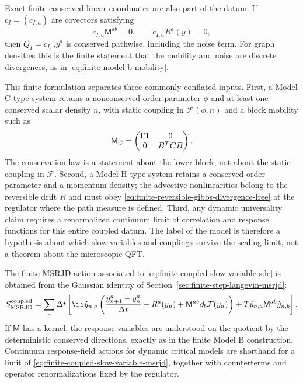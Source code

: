Exact finite conserved linear coordinates are also part of the datum.  If
\(c_I=(c_{I,a})\) are covectors satisfying
\begin{equation}
  c_{I,a}\mathsf M^{ab}=0,
  \qquad
  c_{I,a}R^a(y)=0 ,
  \label{eq:finite-coupled-conserved-covectors}
\end{equation}
then \(Q_I=c_{I,a}y^a\) is conserved pathwise, including the noise term.  For
graph densities this is the finite statement that the mobility and noise are
discrete divergences, as in \eqref{eq:finite-model-b-mobility}.

This finite formulation separates three commonly conflated inputs.  First, a
Model C type system retains a nonconserved order parameter \(\phi\) and at
least one conserved scalar density \(n\), with static coupling in
\(\mathcal F(\phi,n)\) and a block mobility such as
\[
  \mathsf M_{\rm C}
  =
  \begin{pmatrix}
    \Gamma \mathbf1 & 0\\
    0 & B^TCB
  \end{pmatrix}.
\]
The conservation law is a statement about the lower block, not about the
static coupling in \(\mathcal F\).  Second, a Model H type system retains a
conserved order parameter and a momentum density; the advective nonlinearities
belong to the reversible drift \(R\) and must obey
\eqref{eq:finite-reversible-gibbs-divergence-free} at the regulator where the
path measure is defined.  Third, any dynamic universality claim requires a
renormalized continuum limit of correlation and response functions for this
entire coupled datum.  The label of the model is therefore a hypothesis about
which slow variables and couplings survive the scaling limit, not a theorem
about the microscopic QFT.

The finite MSRJD action associated to
\eqref{eq:finite-coupled-slow-variable-sde} is obtained from the Gaussian
identity of Section~\ref{sec:finite-step-langevin-msrjd}:
\begin{equation}
  S_{\rm MSRJD}^{\rm coupled}
  =
  \sum_n\Delta t
  \left[
    \ii\hat y_{n,a}
    \left(
      \frac{y_{n+1}^a-y_n^a}{\Delta t}
      -R^a(y_n)
      +\mathsf M^{ab}\partial_b\mathcal F(y_n)
    \right)
    +
    T\hat y_{n,a}\mathsf M^{ab}\hat y_{n,b}
  \right].
  \label{eq:finite-coupled-slow-variable-msrjd}
\end{equation}
If \(\mathsf M\) has a kernel, the response variables are understood on the
quotient by the deterministic conserved directions, exactly as in the finite
Model B construction.  Continuum response-field actions for dynamic critical
models are shorthand for a limit of
\eqref{eq:finite-coupled-slow-variable-msrjd}, together with counterterms and
operator renormalizations fixed by the regulator.

